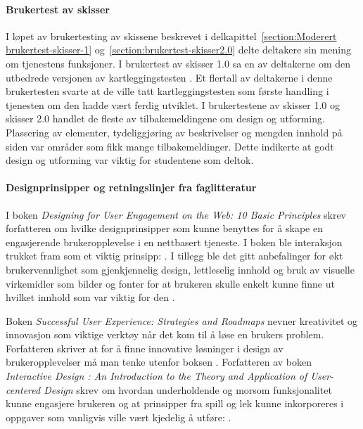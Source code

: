 \paragraph{Brukertest av skisser}
I løpet av brukertesting av skissene beskrevet i delkapittel~\ref{section:Moderert brukertest-skisser-1} og~\ref{section:brukertest-skisser2.0} delte deltakere sin mening om tjenestens funksjoner. I brukertest av skisser 1.0 sa en av deltakerne om den utbedrede versjonen av kartleggingstesten . Et flertall av deltakerne i denne brukertesten svarte at de ville tatt kartleggingstesten som første handling i tjenesten om den hadde vært ferdig utviklet. I brukertestene av skisser 1.0 og skisser 2.0 handlet de fleste av tilbakemeldingene om design og utforming. Plassering av elementer, tydeliggjøring av beskrivelser og mengden innhold på siden var områder som fikk mange tilbakemeldinger. Dette indikerte at godt design og utforming var viktig for studentene som deltok.

\paragraph{Designprinsipper og retningslinjer fra faglitteratur}
I boken {\em Designing for User Engagement on the Web: 10 Basic Principles} skrev forfatteren om hvilke designprinsipper som kunne benyttes for å skape en engasjerende brukeropplevelse i en nettbasert tjeneste. I boken ble interaksjon trukket fram som et viktig prinsipp:  \cite[71]{ENGAGEMENT-WEB:17}. I tillegg ble det gitt anbefalinger for økt brukervennlighet som gjenkjennelig design, lettleselig innhold og bruk av visuelle virkemidler som bilder og fonter for at brukeren skulle enkelt kunne finne ut hvilket innhold som var viktig for den \cite[31]{ENGAGEMENT-WEB:17}. 

Boken {\em Successful User Experience: Strategies and Roadmaps} nevner kreativitet og innovasjon som viktige verktøy når det kom til å løse en brukers problem. Forfatteren skriver at for å finne innovative løsninger i design av brukeropplevelser må man tenke utenfor boksen \cite[29]{SUCCESSFUL-UX:18}. Forfatteren av boken {\em Interactive Design : An Introduction to the Theory and Application of User-centered Design} skrev om hvordan underholdende og morsom funksjonalitet kunne engasjere brukeren og at prinsipper fra spill og lek kunne inkorporeres i oppgaver som vanligvis ville vært kjedelig å utføre:  \cite[123]{INTERACTIVE-DESIGN:19}.

